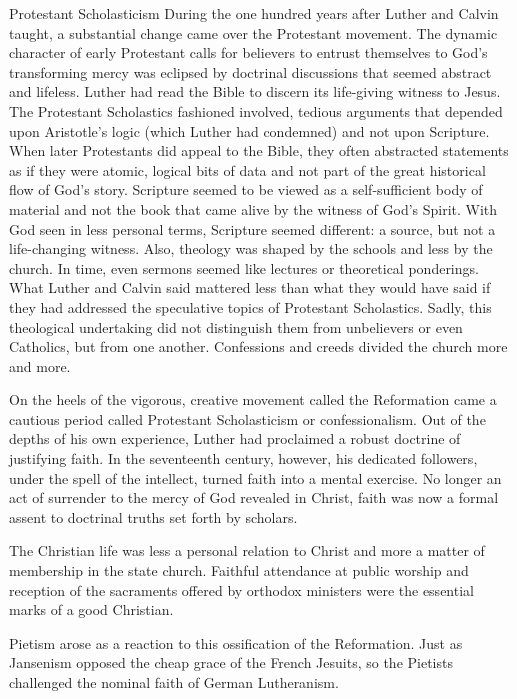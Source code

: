 \begin{sidebar}{Protestant Scholasticism}
During the one hundred years after Luther and Calvin taught, a substantial change came over the
Protestant movement. The dynamic character of early Protestant calls for believers to entrust
themselves to God’s transforming mercy was eclipsed by doctrinal discussions that seemed abstract
and lifeless. Luther had read the Bible to discern its life-giving witness to Jesus. The Protestant
Scholastics fashioned involved, tedious arguments that depended upon Aristotle’s logic (which Luther
had condemned) and not upon Scripture. When later Protestants did appeal to the Bible, they often
abstracted statements as if they were atomic, logical bits of data and not part of the great
historical flow of God’s story. Scripture seemed to be viewed as a self-sufficient body of material
and not the book that came alive by the witness of God’s Spirit. With God seen in less personal
terms, Scripture seemed different: a source, but not a life-changing witness. Also, theology was
shaped by the schools and less by the church. In time, even sermons seemed like lectures or
theoretical ponderings. What Luther and Calvin said mattered less than what they would have said if
they had addressed the speculative topics of Protestant Scholastics. Sadly, this theological
undertaking did not distinguish them from unbelievers or even Catholics, but from one another.
Confessions and creeds divided the church more and more.
\end{sidebar}

On the heels of the vigorous, creative movement called the Reformation came a cautious period called
Protestant Scholasticism or confessionalism. Out of the depths of his own experience, Luther had
proclaimed a robust doctrine of justifying faith. In the seventeenth century, however, his dedicated
followers, under the spell of the intellect, turned faith into a mental exercise. No longer an act
of surrender to the mercy of God revealed in Christ, faith was now a formal assent to doctrinal
truths set forth by scholars.

The Christian life was less a personal relation to Christ and more a matter of membership in the
state church. Faithful attendance at public worship and reception of the sacraments offered by
orthodox ministers were the essential marks of a good Christian.

Pietism arose as a reaction to this ossification of the Reformation. Just as Jansenism opposed the
cheap grace of the French Jesuits, so the Pietists challenged the nominal faith of German
Lutheranism.


